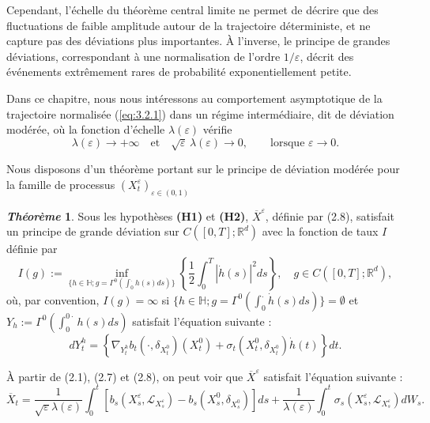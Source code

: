 \documentclass[12pt,a4paper,twoside]{report}%
\theoremstyle{definition}
\newtheorem{thm}[dfn]{\textit{Théorème}}
\numberwithin{equation}{section}
\begin{document}
Cependant, l’échelle du théorème central limite ne permet de décrire que des fluctuations de faible amplitude autour de la trajectoire déterministe, et ne capture pas des déviations plus importantes. À l’inverse, le principe de grandes déviations, correspondant à une normalisation de l’ordre $1/\varepsilon$, décrit des événements extrêmement rares de probabilité exponentiellement petite.

Dans ce chapitre, nous nous intéressons au comportement asymptotique de la trajectoire normalisée (\ref{eq:3.2.1}) dans un régime intermédiaire, dit de déviation modérée, où la fonction d’échelle $\lambda(\varepsilon)$ vérifie
\begin{equation}\label{eq:3.2.2}
\lambda(\varepsilon) \longrightarrow +\infty
\quad \text{et} \quad
\sqrt{\varepsilon}\,\lambda(\varepsilon) \longrightarrow 0,
\qquad \text{lorsque } \varepsilon \to 0.
\end{equation}

Nous disposons d’un théorème portant sur le principe de déviation modérée pour la famille de processus $(X_t^\varepsilon)_{\varepsilon \in(0,1)}$ 
\begin{thm}\label{thm:3.2.1}
	Sous les hypothèses \textbf{(H1)} et \textbf{(H2)}, \(\overline{X}^{\varepsilon}\), définie par (2.8), satisfait un principe de grande déviation sur \(C([0, T]; \mathbb{R}^d)\) avec la fonction de taux \(I\) définie par
	\begin{equation}\label{eq:3.2.3}
		I(g) := \inf_{\{h \in \mathbb{H}; g = \Gamma^0 (\int_{0}^{.} h(s) ds)\}} \left\{ \frac{1}{2} \int_0^T |\dot{h}(s)|^2 ds \right\}, \quad g \in C([0, T]; \mathbb{R}^d),
	\end{equation}
	où, par convention, \(I(g) = \infty\) si \(\{h \in \mathbb{H}; g = \Gamma^0 (\int_{0}^{.} \dot{h}(s) ds)\} = \emptyset\) et \(Y_h := \Gamma^0 (\int_{0}^{0\cdot} h(s) ds)\) satisfait l'équation suivante :
	\begin{equation}\label{eq:3.2.4}
		dY^h_t = \left\{ \nabla_{Y^h_t} b_t (\cdot, \delta_{X_t^0}) (X_t^0) + \sigma_t (X_t^0, \delta_{X_t^0}) \dot{h}(t) \right\} dt.
	\end{equation}
\end{thm}
À partir de (2.1), (2.7) et (2.8), on peut voir que $\overline{X}^\varepsilon$ satisfait l’équation suivante :
\begin{equation}\label{eq:3.2.5}
	\overline{X}_t = \frac{1}{\sqrt{\varepsilon} \lambda(\varepsilon)} \int_0^t [b_s(X_s^\varepsilon, \mathcal{L}_{X_s^\varepsilon}) - b_s(X_s^0, \delta_{X_s^0})] ds + \frac{1}{\lambda(\varepsilon)} \int_0^t \sigma_s(X_s^\varepsilon, \mathcal{L}_{X_s^\varepsilon}) dW_s.
\end{equation}
\end{document}
